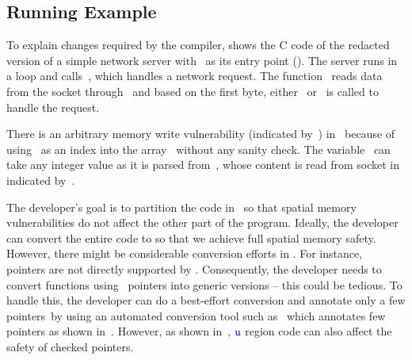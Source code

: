 \subsection{Running Example}
\label{subsec:identifyregionstosbx}

To explain changes required by the \systemname compiler,  shows the C code of the redacted version of a simple network server with~ as its entry point (\entrypoint).
The server runs in a loop and calls~, which handles a network request.
The function~ reads data from the socket through~ and based on the first byte, either~ or~ is called to handle the request.

There is an arbitrary memory write vulnerability (indicated by~\realbug) in~ because of using~ as an index into the array~ without any sanity check.
The variable~ can take any integer value as it is parsed from~, whose content is read from socket in~ indicated by~\rootcause.

The developer's goal is to partition the code in~ so that spatial memory vulnerabilities do not affect the other part of the program.
Ideally, the developer can convert the entire code to \checkedc so that we achieve full spatial memory safety.
However, there might be considerable conversion efforts in \checkedc.
For instance,~ pointers are not directly supported by \checkedc.
Consequently, the developer needs to convert functions using~ pointers into generic versions -- this could be tedious.
To handle this, the developer can do a best-effort conversion and annotate only a few pointers~\eg by using an automated conversion tool such as~\threec{} which annotates few pointers as shown in~.
However, as shown in~, $\textcolor{blue}{\texttt{u}}$ region code can also affect the safety of checked pointers.

